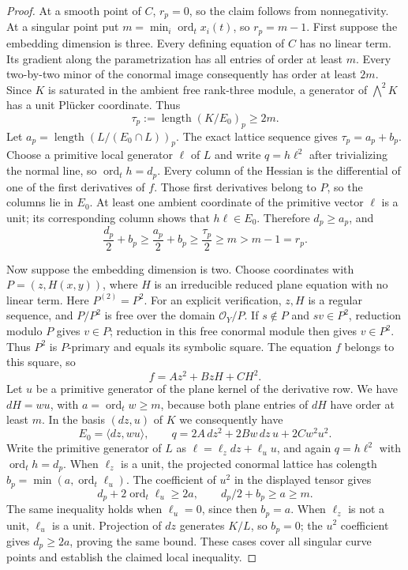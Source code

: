 \begin{proof}
At a smooth point of $C$, $r_p=0$, so the claim follows from
nonnegativity. At a singular point put
$m=\min_i\operatorname{ord}_t x_i(t)$, so $r_p=m-1$.
First suppose the embedding dimension is three. Every defining
equation of $C$ has no linear term. Its gradient along the
parametrization has all entries of order at least $m$.
Every two-by-two minor of the conormal image consequently has
order at least $2m$. Since $K$ is saturated in the ambient free
rank-three module, a generator of $\bigwedge^2K$ has a unit
Pl\"ucker coordinate. Thus
\[
 \tau_p:=\operatorname{length}(K/E_0)_p\geq2m.
\]
Let $a_p=\operatorname{length}(L/(E_0\cap L))_p$.
The exact lattice sequence gives $\tau_p=a_p+b_p$.
Choose a primitive local generator $\ell$ of $L$ and write
$q=h\ell^2$ after trivializing the normal line, so
$\operatorname{ord}_t h=d_p$.
Every column of the Hessian is the differential of one of
the first derivatives of $f$. Those first derivatives belong
to $P$, so the columns lie in $E_0$. At least one ambient
coordinate of the primitive vector $\ell$ is a unit; its
corresponding column shows that $h\ell\in E_0$.
Therefore $d_p\geq a_p$, and
\[
 \frac{d_p}{2}+b_p\geq\frac{a_p}{2}+b_p
 \geq\frac{\tau_p}{2}\geq m>m-1=r_p.
\]

Now suppose the embedding dimension is two. Choose coordinates
with $P=(z,H(x,y))$, where $H$ is an irreducible reduced plane
equation with no linear term. Here $P^{(2)}=P^2$.
For an explicit verification, $z,H$ is a regular sequence, and
$P/P^2$ is free over the domain $\mathcal O_Y/P$.
If $s\notin P$ and $sv\in P^2$, reduction modulo $P$ gives
$v\in P$; reduction in this free conormal module then gives
$v\in P^2$. Thus $P^2$ is $P$-primary and equals its symbolic
square. The equation $f$ belongs to this square, so
\[
 f=A z^2+B zH+C H^2.
\]
Let $u$ be a primitive generator of the plane kernel of the
derivative row. We have $dH=w u$, with
$a=\operatorname{ord}_t w\geq m$, because both plane entries
of $dH$ have order at least $m$. In the basis $(dz,u)$ of $K$
we consequently have
\[
 E_0=\langle dz,w u\rangle,
 \qquad q=2A\,dz^2+2Bw\,dz\,u+2Cw^2u^2.
\]
Write the primitive generator of $L$ as
$\ell=\ell_z dz+\ell_u u$, and again $q=h\ell^2$ with
$\operatorname{ord}_t h=d_p$.
When $\ell_z$ is a unit, the projected conormal lattice has
colength $b_p=\min(a,\operatorname{ord}_t\ell_u)$.
The coefficient of $u^2$ in the displayed tensor gives
\[
 d_p+2\operatorname{ord}_t\ell_u\geq2a,
 \qquad d_p/2+b_p\geq a\geq m.
\]
The same inequality holds when $\ell_u=0$, since then $b_p=a$.
When $\ell_z$ is not a unit, $\ell_u$ is a unit. Projection of
$dz$ generates $K/L$, so $b_p=0$; the $u^2$ coefficient gives
$d_p\geq2a$, proving the same bound. These cases cover all
singular curve points and establish the claimed local inequality.


\end{proof}

